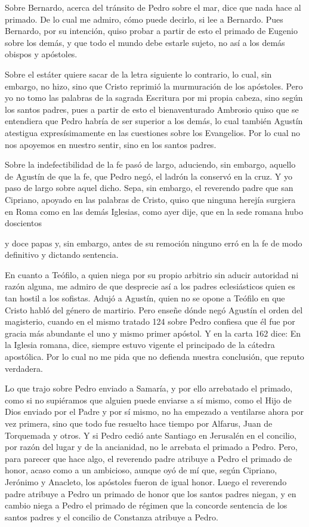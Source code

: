 Sobre Bernardo, acerca del tránsito de Pedro sobre el mar, dice que nada hace al primado. De lo cual me admiro, cómo puede decirlo, si lee a Bernardo. Pues Bernardo, por su intención, quiso probar a partir de esto el primado de Eugenio sobre los demás, y que todo el mundo debe estarle sujeto, no así a los demás obispos y apóstoles.

Sobre el estáter quiere sacar de la letra siguiente lo contrario, lo cual, sin embargo, no hizo, sino que Cristo reprimió la murmuración de los apóstoles. Pero yo no tomo las palabras de la sagrada Escritura por mi propia cabeza, \marginpar{\small[321]} sino según los santos padres, pues a partir de esto el bienaventurado Ambrosio quiso que se entendiera que Pedro habría de ser superior a los demás, lo cual también Agustín atestigua expresísimamente en las cuestiones sobre los Evangelios. Por lo cual no nos apoyemos en nuestro sentir, sino en los santos padres.

Sobre la indefectibilidad de la fe pasó de largo, aduciendo, sin embargo, aquello de Agustín de que la fe, que Pedro negó, el ladrón la conservó en la cruz. Y yo paso de largo sobre aquel dicho. Sepa, sin embargo, el reverendo padre que san Cipriano, apoyado en las palabras de Cristo, quiso que ninguna herejía surgiera en Roma como en las demás Iglesias, como ayer dije, que en la sede romana hubo doscientos

y doce papas y, sin embargo, antes de su remoción ninguno erró en la fe de modo definitivo y dictando sentencia.

En cuanto a Teófilo, a quien niega por su propio arbitrio sin aducir autoridad ni razón alguna, me admiro de que desprecie así a los padres eclesiásticos quien es tan hostil a los sofistas. Adujó a Agustín, quien no se opone a Teófilo en que Cristo habló del género de martirio. Pero enseñe dónde negó Agustín el orden del magisterio, cuando en el mismo tratado 124 sobre Pedro confiesa que él fue por gracia más abundante el uno y mismo primer apóstol. Y en la carta 162 dice: En la Iglesia romana, dice, siempre estuvo vigente el principado de la cátedra apostólica. Por lo cual no me pida que no defienda nuestra conclusión, que reputo verdadera.

Lo que trajo sobre Pedro enviado a Samaría, y por ello arrebatado el primado, como si no supiéramos que alguien puede enviarse a sí mismo, como el Hijo de Dios enviado por el Padre y por sí mismo, no ha empezado a ventilarse ahora por vez primera, sino que todo fue resuelto hace tiempo por Alfarus, Juan de Torquemada y otros. Y si Pedro cedió ante Santiago en Jerusalén en el concilio, por razón del lugar y de la ancianidad, no le arrebata el primado a Pedro. Pero, para parecer que hace algo, el reverendo padre atribuye a Pedro el primado de honor, acaso como a un ambicioso, aunque oyó de mí que, según Cipriano, Jerónimo y Anacleto, los apóstoles fueron de igual honor. Luego el reverendo padre atribuye a Pedro un primado de honor que los santos padres niegan, y en cambio niega a Pedro el primado de régimen que la concorde sentencia de los santos padres y el concilio de Constanza atribuye a Pedro.

